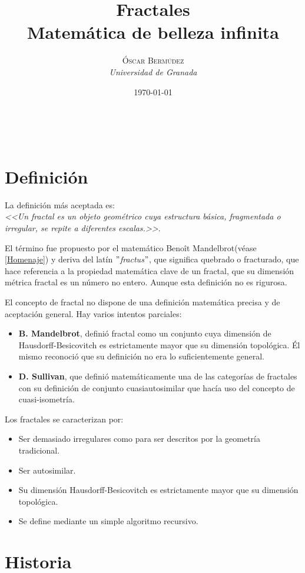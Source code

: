 \documentclass[a4paper, 11pt]{article} %
\title{\textbf{Fractales}\\ %
\vspace{10pt} %
Matemática de belleza infinita} %
\author{\textsc{Óscar Bermúdez} %
\\{\textit{Universidad de Granada}}} %
\date{\today} %
\makeatletter
\renewcommand{\maketitle}{ %
\begin{center} %
{\Huge\@title} %
\end{center}

\vspace{50pt} %

\begin{flushright} %
{\large\@author} %
\\\@date %
\end{flushright}

\vspace{40pt} %
}
\makeatother
\begin{document}
\maketitle %

{\parskip=2pt
  \tableofcontents
}
\pagebreak

\section{Definición}
	La definición más aceptada es:\\
	\textit{<<Un fractal es un objeto geométrico cuya estructura básica, fragmentada o irregular, se repite a diferentes escalas.>>}.
	
	El término fue propuesto por el matemático Benoît Mandelbrot(véase \ref{Homenaje}) y deriva del latín \textit{$"$fractus$"$}, que significa quebrado o fracturado, que hace referencia a la propiedad matemática clave de un fractal, que su dimensión métrica fractal es un número no entero. Aunque esta definición no es rigurosa.
	
	El concepto de fractal no dispone de una definición matemática precisa y de aceptación general. Hay varios intentos parciales:
	\begin{itemize}
		\item \textbf{B. Mandelbrot}, definió fractal como un conjunto cuya dimensión de Hausdorff-Besicovitch es estrictamente mayor que su dimensión topológica. Él mismo reconoció que su definición no era lo suficientemente general.
		\item \textbf{D. Sullivan}, que definió matemáticamente una de las categorías de fractales con su definición de conjunto cuasiautosimilar que hacía uso del concepto de cuasi-isometría.
	\end{itemize}
	
	Los fractales se caracterizan por:
	\begin{itemize}
		\item Ser demasiado irregulares como para ser descritos por la geometría tradicional.
		\item Ser autosimilar.
		\item Su dimensión Hausdorff-Besicovitch es estrictamente mayor que su dimensión topológica.
		\item Se define mediante un simple algoritmo recursivo.
	\end{itemize}
	
\section{Historia}
	
\end{document}
